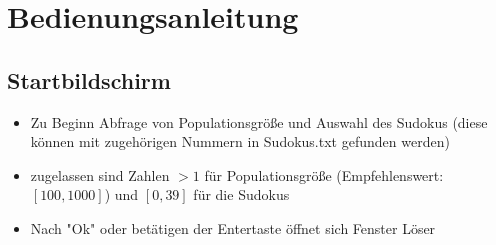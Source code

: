 \documentclass[fontsize=11pt, DIV=calc]{scrartcl} %
\begin{document}
    \section*{Bedienungsanleitung}
    \subsection*{Startbildschirm}
    \begin{itemize}
        \item Zu Beginn Abfrage von Populationsgröße und Auswahl des Sudokus (diese können mit zugehörigen Nummern in Sudokus.txt gefunden werden)
        \item zugelassen sind Zahlen \(>1\) für Populationsgröße (Empfehlenswert: \([100,1000]\)) und \([0,39]\) für die Sudokus
        \item Nach "{}Ok{}"{} oder betätigen der Entertaste öffnet sich Fenster Löser
    \end{itemize}
\end{document}
